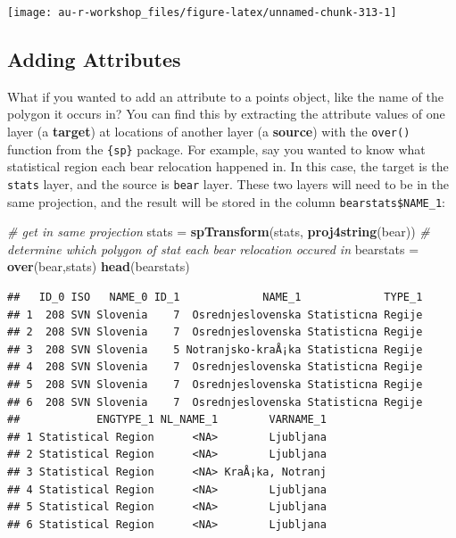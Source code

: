 \documentclass[]{book}
\newenvironment{Shaded}{\begin{snugshade}}{\end{snugshade}}
\newcommand{\KeywordTok}[1]{\textcolor[rgb]{0.13,0.29,0.53}{\textbf{#1}}}
\newcommand{\StringTok}[1]{\textcolor[rgb]{0.31,0.60,0.02}{#1}}
\newcommand{\CommentTok}[1]{\textcolor[rgb]{0.56,0.35,0.01}{\textit{#1}}}
\newcommand{\NormalTok}[1]{#1}
\theoremstyle{definition}
\theoremstyle{definition}
\theoremstyle{definition}
\theoremstyle{remark}
\begin{document}
\begin{center}\texttt{[image: au-r-workshop\_files/figure-latex/unnamed-chunk-313-1]} \end{center}

\subsection{Adding Attributes}\label{add-attr}

What if you wanted to add an attribute to a points object, like the name
of the polygon it occurs in? You can find this by extracting the
attribute values of one layer (a \textbf{target}) at locations of
another layer (a \textbf{source}) with the \texttt{over()} function from
the \texttt{\{sp\}} package. For example, say you wanted to know what
statistical region each bear relocation happened in. In this case, the
target is the \texttt{stats} layer, and the source is \texttt{bear}
layer. These two layers will need to be in the same projection, and the
result will be stored in the column \texttt{bearstats\$NAME\_1}:

\begin{Shaded}
\begin{Highlighting}[]
\CommentTok{# get in same projection}
\NormalTok{stats =}\StringTok{ }\KeywordTok{spTransform}\NormalTok{(stats, }\KeywordTok{proj4string}\NormalTok{(bear))}
\CommentTok{# determine which polygon of stat each bear relocation occured in}
\NormalTok{bearstats =}\StringTok{ }\KeywordTok{over}\NormalTok{(bear,stats)}
\KeywordTok{head}\NormalTok{(bearstats)}
\end{Highlighting}
\end{Shaded}

\begin{verbatim}
##   ID_0 ISO   NAME_0 ID_1             NAME_1             TYPE_1
## 1  208 SVN Slovenia    7  Osrednjeslovenska Statisticna Regije
## 2  208 SVN Slovenia    7  Osrednjeslovenska Statisticna Regije
## 3  208 SVN Slovenia    5 Notranjsko-kraÅ¡ka Statisticna Regije
## 4  208 SVN Slovenia    7  Osrednjeslovenska Statisticna Regije
## 5  208 SVN Slovenia    7  Osrednjeslovenska Statisticna Regije
## 6  208 SVN Slovenia    7  Osrednjeslovenska Statisticna Regije
##            ENGTYPE_1 NL_NAME_1        VARNAME_1
## 1 Statistical Region      <NA>        Ljubljana
## 2 Statistical Region      <NA>        Ljubljana
## 3 Statistical Region      <NA> KraÅ¡ka, Notranj
## 4 Statistical Region      <NA>        Ljubljana
## 5 Statistical Region      <NA>        Ljubljana
## 6 Statistical Region      <NA>        Ljubljana
\end{verbatim}
\end{document}
